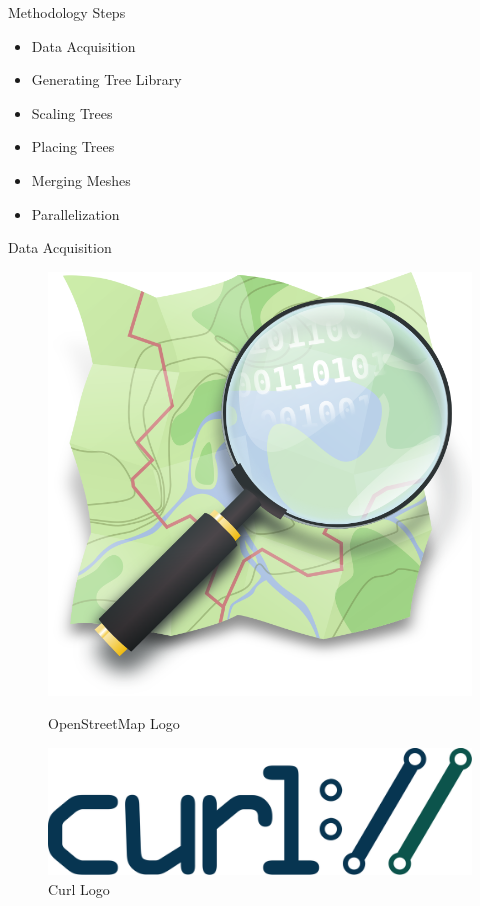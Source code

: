 \documentclass[10pt]{beamer}
\begin{document}
\begin{frame}{Methodology Steps}
	\Large
	\begin{itemize}
		\item Data Acquisition
		\item Generating Tree Library
		\item Scaling Trees
		\item Placing Trees
		\item Merging Meshes
		\item Parallelization
	\end{itemize}
\end{frame}

\begin{frame}{Data Acquisition}
	\begin{figure}[h]
		\centering
		\begin{minipage}{0.49\textwidth}
			\centering
			\includegraphics[width=\textwidth]{images/logo-openstreetmap.png}
			\caption{OpenStreetMap Logo}
			\label{fig:figure1}
		\end{minipage}\hfill
		\begin{minipage}{0.49\textwidth}
			\centering
			\includegraphics[width=\textwidth]{images/logo-curl.png}
			\caption{Curl Logo}
			\label{fig:figure2}
		\end{minipage}
	\end{figure}
\end{frame}
\end{document}
